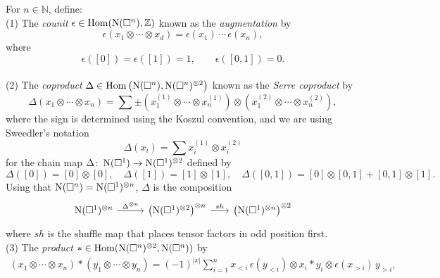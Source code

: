 For $n \in \mathbb{N}$, define: \vspace*{5pt} \\
(1) The \textit{counit} $\epsilon \in \mathrm{Hom}(\operatorname{N}(\square^n), \mathbb{Z})$ known as the \textit{augmentation} by
\begin{equation*}
\epsilon \left( x_1 \otimes \cdots \otimes x_d \right) = \epsilon(x_1) \, \cdots \, \epsilon(x_n),
\end{equation*}
where
\begin{equation*}
\epsilon([0]) = \epsilon([1]) = 1, \qquad \epsilon([0, 1]) = 0.
\end{equation*} \vspace*{-6pt} \\
(2) The \textit{coproduct} $\Delta \in \mathrm{Hom} \left( \operatorname{N}(\square^n), \operatorname{N}(\square^n)^{\otimes 2} \right)$ known as the \textit{Serre coproduct} by
\begin{equation*}	
\Delta (x_1 \otimes \cdots \otimes x_n) = 	
\sum \pm \left( x_1^{(1)} \otimes \cdots \otimes x_n^{(1)} \right) \otimes 	
\left( x_1^{(2)} \otimes \cdots \otimes x_n^{(2)} \right),	
\end{equation*}	
where the sign is determined using the Koszul convention, and we are using Sweedler's notation
\begin{equation*}	
\Delta(x_i) = \sum x_i^{(1)} \otimes x_i^{(2)}
\end{equation*}
for the chain map $\Delta \colon \operatorname{N}(\square^1) \to \operatorname{N}(\square^1)^{\otimes 2}$ defined by
\begin{equation*}
\Delta([0]) = [0] \otimes [0], \quad \Delta([1]) = [1] \otimes [1], \quad \Delta([0, 1]) = [0] \otimes [0, 1] + [0, 1] \otimes [1].
\end{equation*}
Using that $\operatorname{N}(\square^n) = \operatorname{N}(\square^1)^{\otimes n}$, $\Delta$ is the composition
\begin{equation*}
\begin{tikzcd}
\chains(\square^1)^{\otimes n} \arrow[r, "\Delta^{\otimes n}"] &[3pt] \left( \chains(\square^1)^{\otimes 2}  \right)^{\otimes n} \arrow[r, "sh"] &[-5pt] \left( \chains(\square^1)^{\otimes n} \right)^{\otimes 2}
\end{tikzcd}
\end{equation*}
where $sh$ is the shuffle map that places tensor factors in odd position first. \vspace*{5pt} \\
(3) The \textit{product} $\ast \in \mathrm{Hom}(\operatorname{N}(\square^n)^{\otimes 2}, \operatorname{N}(\square^n))$ by
\begin{align*}
(x_1 \otimes \cdots \otimes x_n) \ast (y_1 \otimes \cdots \otimes y_n) =
(-1)^{|x|} \sum_{i=1}^n x_{<i}\, \epsilon(y_{<i}) \otimes x_i \ast y_i \otimes \epsilon(x_{>i}) \, y_{>i},
\end{align*}
